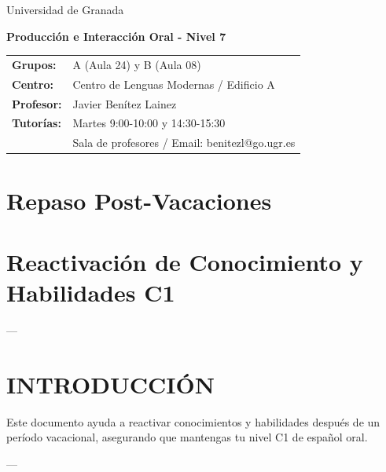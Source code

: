\documentclass[a4paper,11pt]{article}
\begin{document}
\begin{center}
\small{Universidad de Granada}

\vspace{0.3cm}

\textbf{\large{Producción e Interacción Oral - Nivel 7}}

\vspace{0.4cm}

\small
\begin{tabular}{@{}ll@{}}
\textbf{Grupos:} & A (Aula 24) y B (Aula 08) \\
\textbf{Centro:} & Centro de Lenguas Modernas / Edificio A \\
\textbf{Profesor:} & Javier Benítez Lainez \\
\textbf{Tutorías:} & Martes 9:00-10:00 y 14:30-15:30 \\
& Sala de profesores / Email: benitezl@go.ugr.es
\end{tabular}
\end{center}

\vspace{0.5cm}
\section*{Repaso Post-Vacaciones}

\vspace{0.4cm}

\section{Reactivación de Conocimiento y Habilidades C1}

\vspace{0.2cm}

---

\vspace{0.2cm}

\section{INTRODUCCIÓN}

\vspace{0.2cm}

Este documento ayuda a reactivar conocimientos y habilidades después de un período vacacional, asegurando que mantengas tu nivel C1 de español oral.

\vspace{0.2cm}

---
\end{document}
